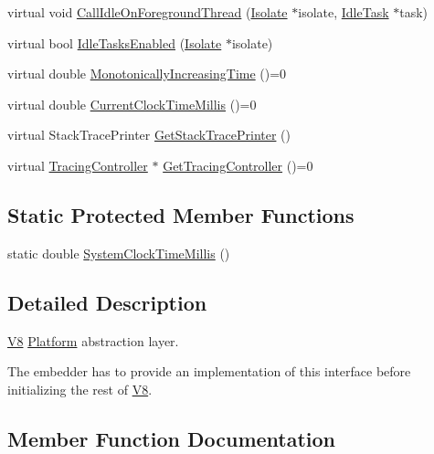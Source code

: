 \begin{DoxyCompactItemize}
\item 
virtual void \mbox{\hyperlink{classv8_1_1Platform_ae495999016432391f04d323452084b12}{Call\+Idle\+On\+Foreground\+Thread}} (\mbox{\hyperlink{classv8_1_1Isolate}{Isolate}} $\ast$isolate, \mbox{\hyperlink{classv8_1_1IdleTask}{Idle\+Task}} $\ast$task)
\item 
virtual bool \mbox{\hyperlink{classv8_1_1Platform_ad229642bf16a066d2e8d866dc128141e}{Idle\+Tasks\+Enabled}} (\mbox{\hyperlink{classv8_1_1Isolate}{Isolate}} $\ast$isolate)
\item 
virtual double \mbox{\hyperlink{classv8_1_1Platform_a6d4d7c2dcf6b0c7113099b97fa7f57b7}{Monotonically\+Increasing\+Time}} ()=0
\item 
virtual double \mbox{\hyperlink{classv8_1_1Platform_a8aa46c7f8e492351ebe1bc8168ec9c2f}{Current\+Clock\+Time\+Millis}} ()=0
\item 
virtual Stack\+Trace\+Printer \mbox{\hyperlink{classv8_1_1Platform_aadb2594e6ff9a6f6a0657412ff5a7206}{Get\+Stack\+Trace\+Printer}} ()
\item 
virtual \mbox{\hyperlink{classv8_1_1TracingController}{Tracing\+Controller}} $\ast$ \mbox{\hyperlink{classv8_1_1Platform_aa760c7bf8c46495eb650d2be72399747}{Get\+Tracing\+Controller}} ()=0
\end{DoxyCompactItemize}
\subsection*{Static Protected Member Functions}
\begin{DoxyCompactItemize}
\item 
static double \mbox{\hyperlink{classv8_1_1Platform_a18ccdaf3a1a738bd4082dbbe749d026b}{System\+Clock\+Time\+Millis}} ()
\end{DoxyCompactItemize}


\subsection{Detailed Description}
\mbox{\hyperlink{classv8_1_1V8}{V8}} \mbox{\hyperlink{classv8_1_1Platform}{Platform}} abstraction layer.

The embedder has to provide an implementation of this interface before initializing the rest of \mbox{\hyperlink{classv8_1_1V8}{V8}}. 

\subsection{Member Function Documentation}
\mbox{\label{classv8_1_1Platform_ada31b440048763bf8d9c296ca4cf2e1b}} 
